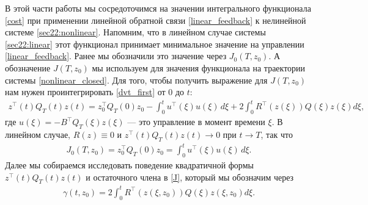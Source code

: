 \documentclass[../main.tex]{subfiles}
\begin{document}
В этой части работы мы сосредоточимся на значении интегрального функционала \eqref{cost} при применении линейной обратной связи \eqref{linear_feedback} к нелинейной системе \eqref{sec22:nonlinear}.
Напомним, что в линейном случае системы \eqref{sec22:linear} этот функционал принимает минимальное значение на управлении \eqref{linear_feedback}.
Ранее мы обозначили это значение через $J_0(T,z_0)$.
А обозначение $J(T,z_0)$ мы используем для значения функционала на траектории системы \eqref{nonlinear_closed}. 
Для того, чтобы получить выражение для $J(T,z_0)$ нам нужен проинтегрировать  \eqref{dvt_first} от $0$ до $t$:
\begin{gather}\label{J}
	z^{\top}(t) Q_T(t)z(t) = z_0^{\top} Q_T(0)z_0 - \int_{0}^{t} u^{\top}(\xi)  u(\xi) \, d\xi + 2\int_{0}^{t}  R^{\top}(z(\xi))Q(\xi) z(\xi) d\xi,
\end{gather}
    где $ u(\xi) = -B^{\top} Q_T(\xi) z(\xi)$ --- это управление в момент времени $\xi$. В линейном случае, $R(z) \equiv 0$ и $z^{\top}(t) Q_T(t)z(t) \to 0 $ при $t \to T$, так что
\begin{gather*}
    J_0(T,z_0) = z_0^{\top} Q_T(0)z_0 = \int_{0}^{t} u^{\top}(\xi)  u(\xi) \, d\xi.
\end{gather*}
Далее мы собираемся исследовать поведение квадратичной формы $z^{\top}(t) Q_T(t)z(t) $ и остаточного члена в \eqref{J}, который мы обозначим через
\begin{gather*}
			\gamma (t,z_0) = 
		 2\int_{0}^{t}  R^{\top}(z(\xi,z_0))Q(\xi) z(\xi,z_0) d\xi.
\end{gather*}
\end{document}
